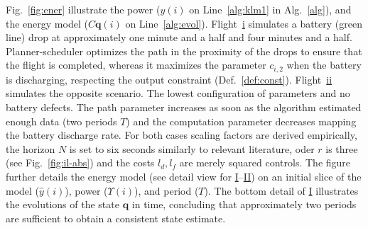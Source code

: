 \documentclass[letterpaper,10pt,journal,twoside]{IEEEtran}
\theoremstyle{definition}
\begin{document}
Fig.~\ref{fig:ener} %
illustrate the power ($y(i)$ on Line~\ref{alg:klm1} in Alg.~\ref{alg}), and the energy model ($C\mathbf{q}(i)$ on Line~\ref{alg:evol}).
Flight~\hyperref[fig:ener-dyn-i]{i} simulates a battery (green line) drop at approximately one minute and a half and four minutes and a half. Planner-scheduler optimizes the path in the proximity of the drops to ensure that the flight is completed, whereas it maximizes the parameter $c_{i,2}$ when the battery is discharging, respecting the output constraint (Def.~\ref{def:const}). Flight~\hyperref[fig:ener-dyn-ii]{ii} simulates the opposite scenario. The lowest configuration of parameters and no battery defects. The path parameter increases as soon as the algorithm estimated enough data (two periods $T$) and the computation parameter decreases mapping the battery discharge rate. For both cases scaling factors are derived empirically, the horizon $N$ is set to six seconds similarly to relevant literature, oder $r$ is three (see Fig.~\ref{fig:il-abs}) and the costs $l_d,l_f$ are merely squared controls.
The figure further details the energy model (see detail view for \hyperref[fig:ener:static-I]{I}--\hyperref[fig:ener:static-II]{II}) on an initial slice of the model (${\hat{y}}(i)$), power ($\Upsilon(i)$), and period ($T$).%
The bottom detail of \hyperref[fig:ener:static-I]{I} illustrates the evolutions of the state $\mathbf{q}$ in time, concluding that approximately two periods are sufficient to obtain a consistent state estimate. %

\end{document}
